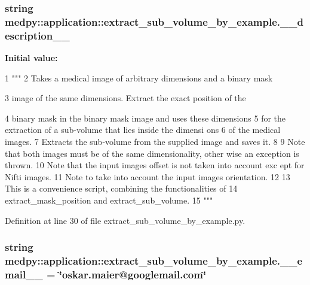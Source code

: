 \hypertarget{namespacemedpy_1_1application_1_1extract__sub__volume__by__example_ad638c24ee2f6e1190596c7a4694b5f30}{
\subsubsection[{\_\-\_\-description\_\-\_\-}]{\setlength{\rightskip}{0pt plus 5cm}string {\bf medpy::application::extract\_\-sub\_\-volume\_\-by\_\-example.\_\-\_\-description\_\-\_\-}}}
\label{namespacemedpy_1_1application_1_1extract__sub__volume__by__example_ad638c24ee2f6e1190596c7a4694b5f30}
{\bfseries Initial value:}
\begin{DoxyCode}
1 """
2                   Takes a medical image of arbitrary dimensions and a binary mask
      
3                   image of the same dimensions. Extract the exact position of the
      
4                   binary mask in the binary mask image and uses these dimensions
5                   for the extraction of a sub-volume that lies inside the dimensi
      ons
6                   of the medical images.
7                   Extracts the sub-volume from the supplied image and saves it.
8                   
9                   Note that both images must be of the same dimensionality, other
      wise an exception is thrown.
10                   Note that the input images offset is not taken into account exc
      ept for Nifti images.
11                   Note to take into account the input images orientation.
12                   
13                   This is a convenience script, combining the functionalities of
14                   extract_mask_position and extract_sub_volume.
15                   """
\end{DoxyCode}


Definition at line 30 of file extract\_\-sub\_\-volume\_\-by\_\-example.py.

\hypertarget{namespacemedpy_1_1application_1_1extract__sub__volume__by__example_a08489272bb0386917806195c898c0a6f}{
\subsubsection[{\_\-\_\-email\_\-\_\-}]{\setlength{\rightskip}{0pt plus 5cm}string {\bf medpy::application::extract\_\-sub\_\-volume\_\-by\_\-example.\_\-\_\-email\_\-\_\-} = \char`\"{}oskar.maier@googlemail.com\char`\"{}}}
\label{namespacemedpy_1_1application_1_1extract__sub__volume__by__example_a08489272bb0386917806195c898c0a6f}


